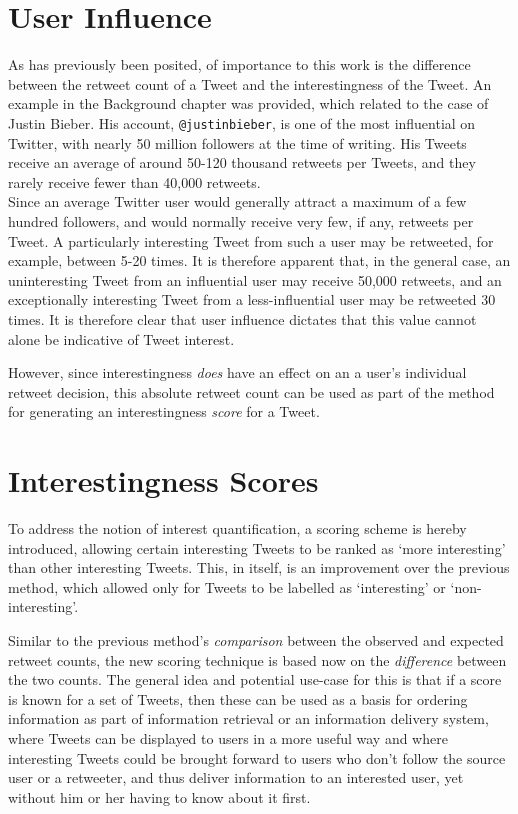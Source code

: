 \section{User Influence}
As has previously been posited, of importance to this work is the difference between the retweet count of a Tweet and the interestingness of the Tweet. An example in the Background chapter was provided, which related to the case of Justin Bieber. His account, \texttt{@justinbieber}, is one of the most influential on Twitter, with nearly 50 million followers at the time of writing. His Tweets receive an average of around 50-120 thousand retweets per Tweets, and they rarely receive fewer than 40,000 retweets.\\
Since an average Twitter user would generally attract a maximum of a few hundred followers, and would normally receive very few, if any, retweets per Tweet. A particularly interesting Tweet from such a user may be retweeted, for example, between 5-20 times. It is therefore apparent that, in the general case, an uninteresting Tweet from an influential user may receive 50,000 retweets, and an exceptionally interesting Tweet from a less-influential user may be retweeted 30 times. It is therefore clear that user influence dictates that this value cannot alone be indicative of Tweet interest.

However, since interestingness \textit{does} have an effect on an a user's individual retweet decision, this absolute retweet count can be used as part of the method for generating an interestingness \textit{score} for a Tweet.


\section{Interestingness Scores}
To address the notion of interest quantification, a scoring scheme is hereby introduced, allowing certain interesting Tweets to be ranked as `more interesting' than other interesting Tweets. This, in itself, is an improvement over the previous method, which allowed only for Tweets to be labelled as `interesting' or `non-interesting'.

Similar to the previous method's \textit{comparison} between the observed and expected retweet counts, the new scoring technique is based now on the \textit{difference} between the two counts. The general idea and potential use-case for this is that if a score is known for a set of Tweets, then these can be used as a basis for ordering information as part of information retrieval or an information delivery system, where Tweets can be displayed to users in a more useful way and where interesting Tweets could be brought forward to users who don't follow the source user or a retweeter, and thus deliver information to an interested user, yet without him or her having to know about it first.

